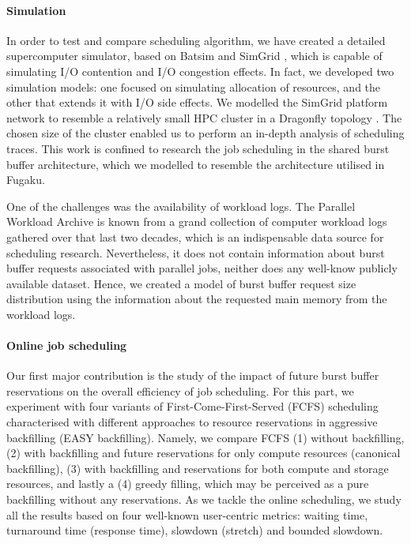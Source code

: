 \documentclass[thesis-en.tex]{subfiles}
\begin{document}
\paragraph{Simulation}
In order to test and compare scheduling algorithm, we have created a detailed supercomputer simulator, based on Batsim \cite{dutot:hal-01333471} and SimGrid \cite{casanova:hal-01017319}, which is capable of simulating I/O contention and I/O congestion effects. In fact, we developed two simulation models: one focused on simulating allocation of resources, and the other that extends it with I/O side effects. We modelled the SimGrid platform network to resemble a relatively small HPC cluster in a Dragonfly topology \cite{kim2008technology}. The chosen size of the cluster enabled us to perform an in-depth analysis of scheduling traces. This work is confined to research the job scheduling in the shared burst buffer architecture, which we modelled to resemble the architecture utilised in Fugaku.

One of the challenges was the availability of workload logs. The Parallel Workload Archive \cite{FEITELSON20142967} is known from a grand collection of computer workload logs gathered over that last two decades, which is an indispensable data source for scheduling research. Nevertheless, it does not contain information about burst buffer requests associated with parallel jobs, neither does any well-know publicly available dataset. Hence, we created a model of burst buffer request size distribution using the information about the requested main memory from the workload logs.

\paragraph{Online job scheduling}
Our first major contribution is the study of the impact of future burst buffer reservations on the overall efficiency of job scheduling. For this part, we experiment with four variants of First-Come-First-Served (FCFS) scheduling characterised with different approaches to resource reservations in aggressive backfilling (EASY backfilling). Namely, we compare FCFS (1) without backfilling, (2) with backfilling and future reservations for only compute resources (canonical backfilling), (3) with backfilling and reservations for both compute and storage resources, and lastly a (4) greedy filling, which may be perceived as a pure backfilling without any reservations. As we tackle the online scheduling, we study all the results based on four well-known user-centric metrics: waiting time, turnaround time (response time), slowdown (stretch) and bounded slowdown. 
\end{document}
